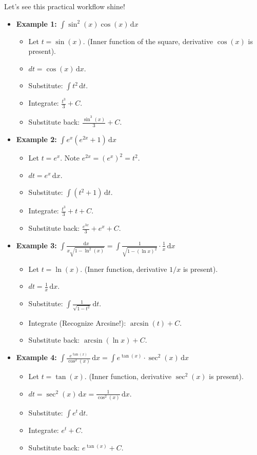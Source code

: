 \documentclass[11pt]{article}
\newcommand{\dx}{\,\mathrm{d}x} %
\newcommand{\dt}{\,\mathrm{d}t} %
\begin{document}
Let's see this practical workflow shine!

\begin{itemize}
    \item \textbf{Example 1:} $\int \sin^2(x) \cos(x) \dx$
        \begin{itemize}
            \item Let $t = \sin(x)$. (Inner function of the square, derivative $\cos(x)$ is present).
            \item $dt = \cos(x) \dx$.
            \item Substitute: $\int t^2 \dt$.
            \item Integrate: $\frac{t^3}{3} + C$.
            \item Substitute back: $\boxed{\frac{\sin^3(x)}{3} + C}$.
        \end{itemize}

    \item \textbf{Example 2:} $\int e^x(e^{2x}+1) \dx$
        \begin{itemize}
            \item Let $t = e^x$. Note $e^{2x} = (e^x)^2 = t^2$.
            \item $dt = e^x \dx$.
            \item Substitute: $\int (t^2+1) \dt$.
            \item Integrate: $\frac{t^3}{3} + t + C$.
            \item Substitute back: $\boxed{\frac{e^{3x}}{3} + e^x + C}$.
         \end{itemize}
         
    \item \textbf{Example 3:} $\int \frac{\dx}{x\sqrt{1-\ln^2(x)}} = \int \frac{1}{\sqrt{1-(\ln x)^2}} \cdot \frac{1}{x} \dx$
        \begin{itemize}
            \item Let $t = \ln(x)$. (Inner function, derivative $1/x$ is present).
            \item $dt = \frac{1}{x} \dx$.
            \item Substitute: $\int \frac{1}{\sqrt{1-t^2}} \dt$.
            \item Integrate (Recognize Arcsine!): $\arcsin(t) + C$.
            \item Substitute back: $\boxed{\arcsin(\ln x) + C}$.
        \end{itemize}

    \item \textbf{Example 4:} $\int \frac{e^{\tan(x)}}{\cos^2(x)} \dx = \int e^{\tan(x)} \cdot \sec^2(x) \dx$
        \begin{itemize}
            \item Let $t = \tan(x)$. (Inner function, derivative $\sec^2(x)$ is present).
            \item $dt = \sec^2(x) \dx = \frac{1}{\cos^2(x)} \dx$.
            \item Substitute: $\int e^t \dt$.
            \item Integrate: $e^t + C$.
            \item Substitute back: $\boxed{e^{\tan(x)} + C}$.
        \end{itemize}
\end{itemize}
\end{document}
